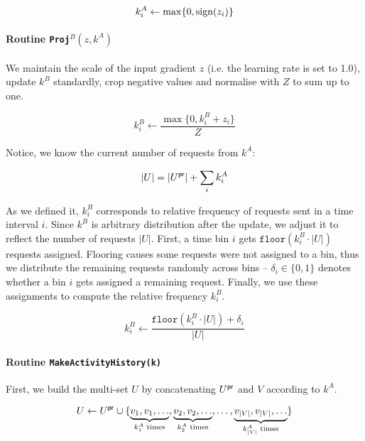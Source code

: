 \begin{equation}
    k_i^{A} \gets \max\{ 0, \text{sign}(z_i) \}
\end{equation}

\paragraph{Routine \texttt{Proj}$^B(z, k^A)$}
We maintain the scale of the input gradient $z$ (i.e. the learning rate is set to 1.0), update $k^B$ standardly, crop negative values and normalise with $Z$ to sum up to one.

\begin{equation}
    k_i^B \gets \frac{\max\{ 0,  k_i^B + z_i \} }{Z}
\end{equation}

Notice, we know the current number of requests from $k^A$:

\begin{equation}
    |U| = |U^{\mathsf{pr}}| + \sum_i k_i^A
\end{equation}

As we defined it, $k_i^B$ corresponds to relative frequency of requests sent in a time interval $i$. Since $k^B$ is arbitrary distribution after the update, we adjust it to reflect the number of requests $|U|$. First, a time bin $i$ gets  $\texttt{floor}(k_i^B \cdot |U|)$ requests assigned. Flooring causes some requests were not assigned to a bin, thus we distribute the remaining requests randomly across bins – $\delta_i \in \{0 ,1 \}$ denotes whether a bin $i$ gets assigned a remaining request. Finally, we use these assignments to compute the relative frequency $k_i^B$.

\begin{equation}
    k_i^B \gets \frac{\texttt{floor}(k_i^B \cdot |U|) + \delta_i}{|U|}
\end{equation}

\paragraph{Routine \texttt{MakeActivityHistory(k)}}
First, we build the multi-set $U$ by concatenating $U^{\mathsf{pr}}$ and $V$ according to $k^A$.

\begin{equation}
    U \gets U^{\mathsf{pr}} \cup \{
        \underbrace{v_1, v_1, \dots}_{k_1^A \textrm{ times}},
        \underbrace{v_2, v_2, \dots}_{k_2^A \textrm{ times}},
        \dots,
        \underbrace{v_{|V|}, v_{|V|}, \dots}_{k_{|V|}^A \textrm{ times}}
    \}
\end{equation}

